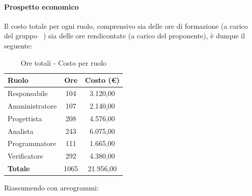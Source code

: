 \documentclass[../PianoProgetto.tex]{subfiles}
\begin{document}
\vfill	
	
	\paragraph{Prospetto economico}
					Il costo totale per ogni ruolo, comprensivo sia delle ore di formazione (a carico del gruppo \leaf\ ) sia delle ore rendicontate (a carico del proponente), è dunque il seguente:
	\begin{table}[h]
		\centering
		\begin{tabular}{l * {2}{c}}
			\toprule
			\textbf{Ruolo} & \textbf{Ore} & \textbf{Costo (\euro{})} \\
			\midrule
			Responsabile &	104 & 3.120,00 \\
			Amministratore & 107 & 2.140,00 \\
			Progettista & 208 & 4.576,00 \\
			Analista & 243 & 6.075,00 \\
			Programmatore & 111 & 1.665,00 \\
			Verificatore & 292 & 4.380,00 \\
			\midrule		
			\textbf{Totale} & 1065 &  21.956,00 \\
			\bottomrule
		\end{tabular}
		\caption{Ore totali - Costo per ruolo}
		\label{tab:totale_costo}
	\end{table}
\vfill
\newpage	
\vfill
	Riassumendo con areogrammi:
\end{document}
